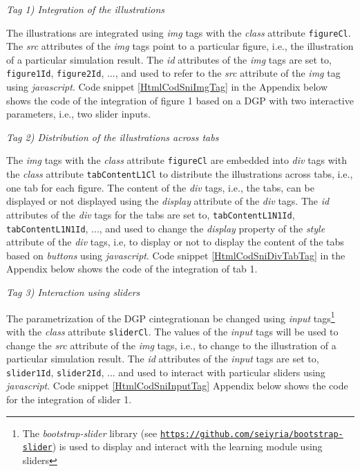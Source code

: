 \documentclass[12pt]{article}
\begin{document}

\vspace{1em}
\noindent\emph{Tag 1) Integration of the illustrations}

The illustrations are integrated using \emph{img} tags with the \emph{class} attribute \texttt{figureCl}. 
%
The \emph{src} attributes of the \emph{img} tags point to a particular figure, i.e., the illustration of a particular simulation result. 
%
The \emph{id} attributes of the \emph{img} tags are set to, \texttt{figure1Id}, \texttt{figure2Id}, ..., and used to refer to the \emph{src} attribute of the \emph{img} tag using \emph{javascript}. 
%
Code snippet \ref{HtmlCodSniImgTag} in the Appendix below shows the code of the integration of figure 1 based on a DGP with two interactive parameters, i.e., two slider inputs. 


\vspace{1em}
\noindent\emph{Tag 2) Distribution of the illustrations across tabs}

The \emph{img} tags with the \emph{class} attribute \texttt{figureCl} are embedded into \emph{div} tags with the \emph{class} attribute \texttt{tabContentL1Cl} to distribute the illustrations across tabs, i.e., one tab for each figure. 
%
The content of the \emph{div} tags, i.e., the tabs, can be displayed or not displayed using the \emph{display} attribute of the \emph{div} tags. 
%
The \emph{id} attributes of the \emph{div} tags for the tabs are set to, \texttt{tabContentL1N1Id}, \texttt{tabContentL1N1Id}, ..., and used to change the \emph{display} property of the \emph{style} attribute of the \emph{div} tags, i.e, to display or not to display the content of the tabs based on \emph{buttons} using \emph{javascript}. 
%
Code snippet \ref{HtmlCodSniDivTabTag} in the Appendix below shows the code of the integration of tab 1. 


\vspace{1em}
\noindent\emph{Tag 3) Interaction using sliders}

The parametrization of the DGP cintegrationan be changed using \emph{input} tags\footnote{The \emph{bootstrap-slider} library (see \href{https://github.com/seiyria/bootstrap-slider}{\texttt{https://github.com/seiyria/bootstrap-slider}}) is used to display and interact with the learning module using sliders} with the \emph{class} attribute \texttt{sliderCl}. 
%
The values of the \emph{input} tags will be used to change the \emph{src} attribute of the \emph{img} tags, i.e., to change to the illustration of a particular simulation result. 
%
The \emph{id} attributes of the \emph{input} tags are set to, \texttt{slider1Id}, \texttt{slider2Id}, ... and used to interact with particular sliders using \emph{javascript}. 
%
Code snippet \ref{HtmlCodSniInputTag} Appendix below shows the code for the integration of slider 1. 
\end{document}
